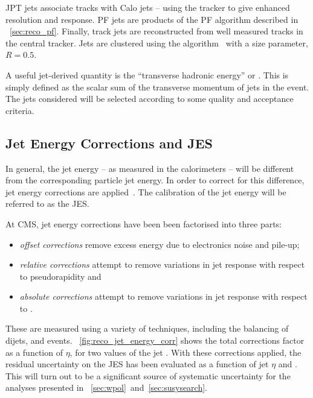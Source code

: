 \ac{JPT} jets associate tracks with \ac{Calo} jets -- using the tracker to give
enhanced \Pt resolution and response. \ac{PF} jets are products of the \acl{PF}
algorithm described in \sec~\ref{sec:reco_pf}. Finally, track jets are
reconstructed from well measured tracks in the central tracker. Jets are
clustered using the \antiKT algorithm~\cite{antiKT} with a size parameter,
$R=0.5$.

A useful jet-derived quantity is the ``transverse hadronic energy'' or \HT. This
is simply defined as the scalar sum of the transverse momentum of jets in the
event. The jets considered will be selected according to some quality and
acceptance criteria.

\subsection{Jet Energy Corrections and \acl{JES}}
In general, the jet energy -- as measured in the calorimeters -- will be
different from the corresponding particle jet energy. In order to correct for
this difference, jet energy corrections are
applied~\cite{jet_energy_cms,jet_energy_pas}. The calibration of the jet energy
will be referred to as the \acf{JES}.

At \ac{CMS}, jet energy corrections have been been factorised into three parts:
\begin{itemize}
\item \emph{offset corrections} remove excess energy due to electronics noise
  and pile-up;
\item \emph{relative corrections} attempt to remove variations in jet response
  with respect to pseudorapidity and
\item \emph{absolute corrections} attempt to remove variations in jet response
  with respect to \Pt.
\end{itemize}

These are measured using a variety of techniques, including the balancing of
dijets, \gammajets and \Zjets events. \fig~\ref{fig:reco_jet_energy_corr} shows
the total corrections factor as a function of $\eta$, for two values of the jet
\Pt. With these corrections applied, the residual uncertainty on the \ac{JES}
has been evaluated as a function of jet $\eta$ and \Pt. This will turn out to be
a significant source of systematic uncertainty for the analyses presented in
\chaps~\ref{sec:wpol}~and~\ref{sec:susysearch}.

